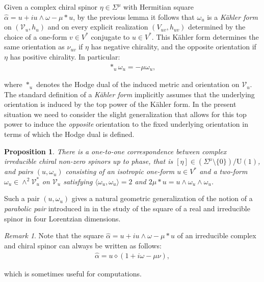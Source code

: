 \documentclass[10pt,a4paper,twoside,reqno]{amsart}
\theoremstyle{plain}
\newtheorem{prop}[thm]{Proposition}
\theoremstyle{definition}
\theoremstyle{remark}
\newtheorem{remark}[thm]{Remark}
\def\U{\mathrm{U}}
\def\cV{\mathcal{V}}
\newcommand{\escal}[1]{\langle#1\rangle}
\begin{document}
\noindent
Given a complex chiral spinor $\eta\in \Sigma^{\mu}$ with Hermitian square $\widehat{\alpha} = u + i u\wedge \omega - \mu \ast u$, by the previous lemma it follows that $\omega_u$ is a \emph{Kähler form} on $(\cV_u , h_u)$ and on every explicit realization $(V_{uv} , h_{uv})$ determined by the choice of a one-form $v\in V^{\ast}$ conjugate to $u\in V^{\ast}$. This Kähler form determines the same orientation as $\nu_{uv}$ if $\eta$ has negative chirality, and the opposite orientation if $\eta$ has positive chirality. In particular:
\begin{eqnarray*}
\ast_u \omega_u = -\mu \omega_u,
\end{eqnarray*}

\noindent
where $\ast_u$ denotes the Hodge dual of the induced metric and orientation on $\cV_u$. The standard definition of a \emph{Kähler form} implicitly assumes that the underlying orientation is induced by the top power of the Kähler form. In the present situation we need to consider the slight generalization that allows for this top power to induce the \emph{opposite} orientation to the fixed underlying orientation in terms of which the Hodge dual is defined.  

\begin{prop}
There is a one-to-one correspondence between complex irreducible chiral non-zero spinors up to phase, that is $[\eta]\in(\Sigma^\mu\setminus\{0\})/\U(1)$, and pairs $(u,\omega_u)$ consisting of an isotropic one-form $u\in V^{\ast}$ and a two-form $\omega_u \in \wedge^2 \cV_u^{\ast}$ on $\cV_u$ satisfying $\escal{\omega_u,\omega_u}=2$ and $2\mu*u=u\wedge\omega_u\wedge\omega_u$.
\end{prop}

\noindent
Such a pair $(u,\omega_u)$ gives a natural geometric generalization of the notion of a \emph{parabolic pair} introduced in \cite{Murcia:2020zig,Murcia:2021dur} in the study of the square of a real and irreducible spinor in four Lorentzian dimensions. 

\begin{remark}
\label{remark:specialform6d} 
Note that the square $\widehat{\alpha} = u + i u\wedge \omega - \mu \ast u$ of an irreducible complex and chiral spinor can always be written as follows:
\begin{eqnarray*}
\widehat{\alpha} = u \diamond (1 + i \omega - \mu \nu),
\end{eqnarray*}

\noindent
which is sometimes useful for computations.
\end{remark}
\end{document}
